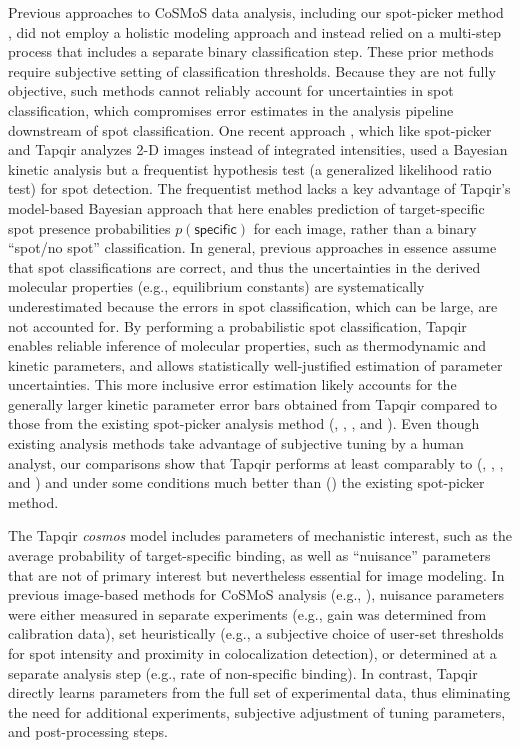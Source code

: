 Previous approaches to CoSMoS data analysis, including our spot-picker method \citep{Friedman2015-nx}, did not employ a holistic modeling approach and instead relied on a multi-step process that includes a separate binary classification step.  These prior methods require subjective setting of classification thresholds.  Because they are not fully objective, such methods cannot reliably account for uncertainties in spot classification, which compromises error estimates in the analysis pipeline downstream of spot classification. One recent approach \citep{Smith2019-yb,Smith2015-gf}, which like spot-picker and Tapqir analyzes 2-D images instead of integrated intensities, used a Bayesian kinetic analysis but a frequentist hypothesis test (a generalized likelihood ratio test) for spot detection.  The frequentist method lacks a key advantage of Tapqir's model-based Bayesian approach that here enables prediction of target-specific spot presence probabilities $p(\mathsf{specific})$ for each image, rather than a binary ``spot/no spot'' classification.  In general, previous approaches in essence assume that spot classifications are correct, and thus the uncertainties in the derived molecular properties (e.g., equilibrium constants) are systematically underestimated because the errors in spot classification, which can be large, are not accounted for. By performing a probabilistic spot classification, Tapqir enables reliable inference of molecular properties, such as thermodynamic and kinetic parameters, and allows statistically  well-justified estimation of parameter uncertainties.  This more inclusive error estimation likely accounts for the generally larger kinetic parameter error bars obtained from Tapqir compared to those from the existing spot-picker analysis method (, , , and ). Even though existing analysis methods take advantage of subjective tuning by a human analyst, our comparisons show that Tapqir performs at least comparably to (, , , and ) and under some conditions much better than () the existing spot-picker method.

The Tapqir \emph{cosmos} model includes parameters of mechanistic interest, such as the average probability of target-specific binding, as well as ``nuisance'' parameters that are not of primary interest but nevertheless essential for image modeling. In previous image-based methods for CoSMoS analysis (e.g., \citep{Friedman2015-nx,Smith2019-yb}), nuisance parameters were either measured in separate experiments (e.g., gain was determined from calibration data), set heuristically (e.g., a subjective choice of user-set thresholds for spot intensity and proximity in colocalization detection), or determined at a separate analysis step (e.g., rate of non-specific binding). In contrast, Tapqir directly learns parameters from the full set of experimental data, thus eliminating the need for additional experiments, subjective adjustment of tuning parameters, and post-processing steps.

